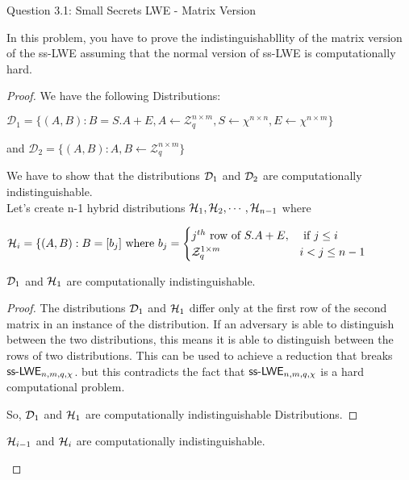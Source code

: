 \begin{solution}{Question 3.1: Small Secrets LWE - Matrix Version}\label{ques:31}
    \begin{question}
    In this problem, you have to prove the indistinguishabllity of the matrix version of the ss-LWE assuming that the normal version of ss-LWE is computationally hard. 
    \end{question}
    \tcblower{}
    
    \begin{proof}
    We have the following Distributions:

    $\mathcal{D}_{1} = \{ (A,B): B = S . A + E, A \leftarrow \mathcal{Z}_q^{n\times m}, S \leftarrow \chi^{n\times n}, E \leftarrow \chi^{n\times m}\}$

    and $\mathcal{D}_{2} = \{ (A,B):  A,B \leftarrow \mathcal{Z}_q^{n\times m} \}$

    We have to show that the distributions $\mathcal{D}_1$ and $\mathcal{D}_2$ are computationally indistinguishable.\\
    
    Let's create n-1 hybrid distributions $\mathcal{H}_1,\mathcal{H}_2,\cdots,\mathcal{H}_{n-1}$ where 

    $\mathcal{H}_i = \{ (A,B): B = [b_j] \text{ where }b_j = 
    \begin{cases}
    j^{th} \text{ row of } S.A+E, &\text{ if } j \leq i\\
    \mathcal{Z}_q^{1\times m} &i < j\leq n-1 
    \end{cases}$

    \begin{claim}
    $\mathcal{D}_1$ and $\mathcal{H}_1$ are computationally indistinguishable.
    \end{claim}

    \begin{proof}
        The distributions $\mathcal{D}_1$ and $\mathcal{H}_1$ differ only at the first row of the second matrix in an instance of the distribution. If an adversary is able to distinguish between the two distributions,  this means it is able to distinguish between the rows of two distributions. This can be used to achieve a reduction that breaks $\mathsf{ss\text{-}LWE}_{n,m,q,\chi}$. but this contradicts the fact that $\mathsf{ss\text{-}LWE}_{n,m,q,\chi}$ is a hard computational problem.

        So, $\mathcal{D}_1$ and $\mathcal{H}_1$ are computationally indistinguishable Distributions.
        
    \end{proof}

    \begin{claim}
    $\mathcal{H}_{i-1}$ and $\mathcal{H}_{i}$ are computationally indistinguishable.
    \end{claim}


\end{proof}
\end{solution}

